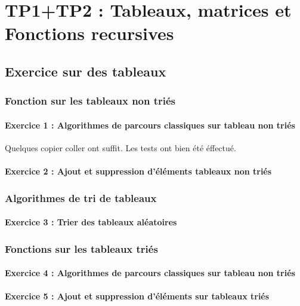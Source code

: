 \chapter{TP1+TP2 : Tableaux, matrices et Fonctions recursives}

\section{Exercice sur des tableaux}

\subsection{Fonction sur les tableaux non triés}

\subsubsection{Exercice 1 : Algorithmes de parcours classiques sur tableau non triés}
Quelques copier coller ont suffit.
Les tests ont bien été éffectué.

\subsubsection{Exercice 2 : Ajout et suppression d'éléments tableaux non triés}

\subsection{Algorithmes de tri de tableaux}

\subsubsection{Exercice 3 : Trier des tableaux aléatoires}

\subsection{Fonctions sur les tableaux triés}

\subsubsection{Exercice 4 : Algorithmes de parcours classiques sur tableau non triés}

\subsubsection{Exercice 5 : Ajout et suppression d’éléments sur tableaux triés}

